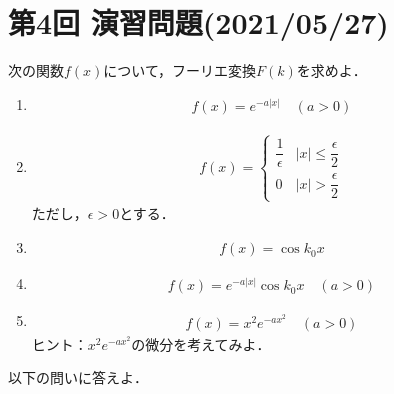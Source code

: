 \section*{第4回 演習問題(2021/05/27)}
%
\enshu
%
次の関数$f(x)$について，フーリエ変換$F(k)$を求めよ．
\begin{enumerate}[(1)]
  \item 
	\begin{align*}
	  f(x) = e^{-a\left|x\right|}\quad (a>0)
	\end{align*}	
  \item 
	\begin{align*}
	  f(x) = 
	  \begin{cases}
	    \dfrac{1}{\epsilon} & \left|x\right| \leq \dfrac{\epsilon}{2} \\[.2cm]
            0                   & \left|x\right| >  \dfrac{\epsilon}{2}
	  \end{cases}
	\end{align*}
	ただし，$\epsilon > 0$とする．
  \item 
	\begin{align*}
	  f(x) = \cos k_0 x
	\end{align*}
  \item	
	\begin{align*}
	  f(x) = e^{-a\left|x\right|}\cos k_0 x \quad (a>0) 
	\end{align*}
  \item	
	\begin{align*}
	  f(x) = x^2 e^{-ax^2} \quad (a>0)
	\end{align*}
	ヒント：$x^2 e^{-ax^2}$の微分を考えてみよ．
\end{enumerate}
%
\enshu
以下の問いに答えよ．
